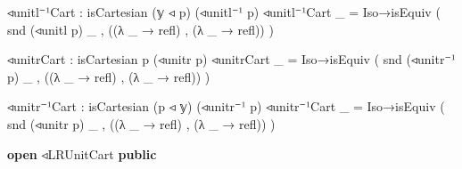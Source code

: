 \documentclass[
  11pt,
  oneside,
  article]{memoir}
\newenvironment{Shaded}{}{}
\newcommand{\KeywordTok}[1]{\textcolor[rgb]{0.00,0.44,0.13}{\textbf{#1}}}
\newcommand{\NormalTok}[1]{#1}
\newcommand{\OtherTok}[1]{\textcolor[rgb]{0.00,0.44,0.13}{#1}}
\theoremstyle{definition}
\theoremstyle{plain}
\newcommand{\0}{\textsf{0}}
\newcommand{\1}{\tn{\textsf{1}}}
\begin{document}
\begin{Shaded}
\begin{Highlighting}[]
\NormalTok{    ◃unitl⁻¹Cart }\OtherTok{:}\NormalTok{ isCartesian }\OtherTok{(}\NormalTok{𝕪 ◃ p}\OtherTok{)} \OtherTok{(}\NormalTok{◃unitl⁻¹ p}\OtherTok{)}
\NormalTok{    ◃unitl⁻¹Cart }\OtherTok{\_} \OtherTok{=} 
\NormalTok{        Iso→isEquiv }
            \OtherTok{(}\NormalTok{ snd }\OtherTok{(}\NormalTok{◃unitl p}\OtherTok{)} \OtherTok{\_} 
\NormalTok{            , }\OtherTok{((λ} \OtherTok{\_} \OtherTok{→}\NormalTok{ refl}\OtherTok{)}\NormalTok{ , }\OtherTok{(λ} \OtherTok{\_} \OtherTok{→}\NormalTok{ refl}\OtherTok{))} \OtherTok{)}

\NormalTok{    ◃unitrCart }\OtherTok{:}\NormalTok{ isCartesian p }\OtherTok{(}\NormalTok{◃unitr p}\OtherTok{)}
\NormalTok{    ◃unitrCart }\OtherTok{\_} \OtherTok{=} 
\NormalTok{        Iso→isEquiv }
            \OtherTok{(}\NormalTok{ snd }\OtherTok{(}\NormalTok{◃unitr⁻¹ p}\OtherTok{)} \OtherTok{\_} 
\NormalTok{            , }\OtherTok{((λ} \OtherTok{\_} \OtherTok{→}\NormalTok{ refl}\OtherTok{)}\NormalTok{ , }\OtherTok{(λ} \OtherTok{\_} \OtherTok{→}\NormalTok{ refl}\OtherTok{))} \OtherTok{)}

\NormalTok{    ◃unitr⁻¹Cart }\OtherTok{:}\NormalTok{ isCartesian }\OtherTok{(}\NormalTok{p ◃ 𝕪}\OtherTok{)} \OtherTok{(}\NormalTok{◃unitr⁻¹ p}\OtherTok{)}
\NormalTok{    ◃unitr⁻¹Cart }\OtherTok{\_} \OtherTok{=} 
\NormalTok{        Iso→isEquiv }
            \OtherTok{(}\NormalTok{ snd }\OtherTok{(}\NormalTok{◃unitr p}\OtherTok{)} \OtherTok{\_} 
\NormalTok{            , }\OtherTok{((λ} \OtherTok{\_} \OtherTok{→}\NormalTok{ refl}\OtherTok{)}\NormalTok{ , }\OtherTok{(λ} \OtherTok{\_} \OtherTok{→}\NormalTok{ refl}\OtherTok{))} \OtherTok{)}

\KeywordTok{open}\NormalTok{ ◃LRUnitCart }\KeywordTok{public}
\end{Highlighting}
\end{Shaded}
\end{document}
